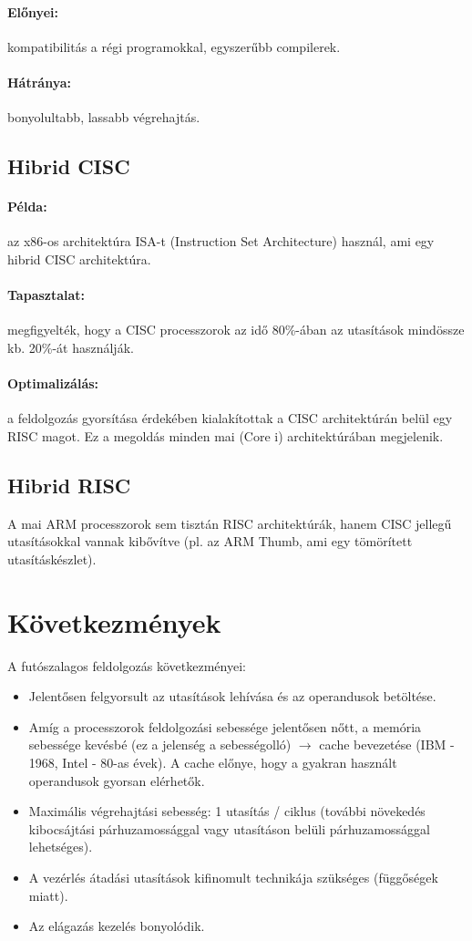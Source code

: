 \paragraph{Előnyei:} kompatibilitás a régi programokkal, egyszerűbb compilerek.
\paragraph{Hátránya:} bonyolultabb, lassabb végrehajtás.

\subsection{Hibrid CISC}
\paragraph{Példa:} az x86-os architektúra ISA-t (Instruction Set Architecture) használ, ami egy hibrid CISC architektúra.
\paragraph{Tapasztalat:} megfigyelték, hogy a CISC processzorok az idő 80\%-ában az utasítások mindössze kb. 20\%-át használják.
\paragraph{Optimalizálás:} a feldolgozás gyorsítása érdekében kialakítottak a CISC architektúrán belül egy RISC magot.
Ez a megoldás minden mai (Core i) architektúrában megjelenik.

\subsection{Hibrid RISC}
A mai ARM processzorok sem tisztán RISC architektúrák, hanem CISC jellegű utasításokkal vannak kibővítve (pl. az ARM Thumb, ami egy tömörített utasításkészlet).

\section{Következmények}
A futószalagos feldolgozás következményei:
\begin{itemize}
    \item Jelentősen felgyorsult az utasítások lehívása és az operandusok betöltése.
    \item Amíg a processzorok feldolgozási sebessége jelentősen nőtt, a memória sebessége kevésbé (ez a jelenség a sebességolló) $\rightarrow$ cache bevezetése (IBM - 1968, Intel - 80-as évek). A cache előnye, hogy a gyakran használt operandusok gyorsan elérhetők.
    \item Maximális végrehajtási sebesség: 1 utasítás / ciklus (további növekedés kibocsájtási párhuzamossággal vagy utasításon belüli párhuzamossággal lehetséges).
    \item A vezérlés átadási utasítások kifinomult technikája szükséges (függőségek miatt).
    \item Az elágazás kezelés bonyolódik.
\end{itemize}

